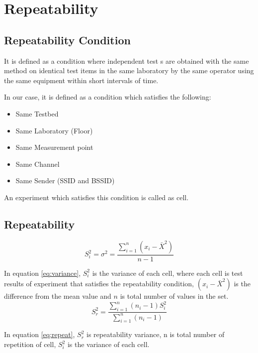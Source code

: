 \documentclass[11pt,a4paper,headinclude,footinclude,chapterprefix=on]{scrreprt}
\begin{document}
\section{Repeatability} 
\subsection{Repeatability Condition} It is defined as a condition where independent test 
s are obtained with the same method on identical test items in the same laboratory by the same operator using the same equipment within short intervals of time.

In our case, it is defined as a condition which satisfies the following: 
\begin{itemize}
	\item Same Testbed 
	\item Same Laboratory (Floor) 
	\item Same Measurement point 
	\item Same Channel 
	\item Same Sender (SSID and BSSID) 
\end{itemize}

An experiment which satisfies this condition is called as cell. 

\subsection{Repeatability} 
\begin{equation}
	\label{eq:variance} {S}_i^2 = {\sigma}^2 = \frac{\sum\limits_{i=1}^{n} (x_{i} - \bar{X}^2)}{n-1} 
\end{equation}

In equation \ref{eq:variance}, $S_{i}^{2}$ is the variance of each cell, where each cell is test results of experiment that satisfies the repeatability condition, $(x_{i} - \bar{X}^2)$ is the difference from the mean value and $n$ is total number of values in the set. 
\begin{equation}
	\label{eq:repeat} {S}_r^2 = \frac{\sum\limits_{i=1}^{n} (n_{i} - 1){S}_i^2} {\sum\limits_{i=1}^{n}(n_{i} - 1)} 
\end{equation}

In equation \ref{eq:repeat}, ${S}_r^2$ is repeatability variance, n is total number of repetition of cell, $S_{i}^{2}$ is the variance of each cell. 

\end{document}
